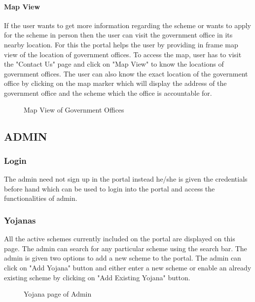 \documentclass[conference]{IEEEtran}
\begin{document}
\paragraph{Map View}
If the user wants to get more information regarding the scheme or wants to apply for the scheme in person then the user can visit the government office in its nearby location. For this the portal helps the user by providing in frame map view of the location of government offices.
To access the map, user has to visit the "Contact Us" page and click on "Map View" to know the locations of government offices. The user can also know the exact location of the government office by clicking on the map marker which will display the address of the government office and the scheme which the office is accountable for.
\begin{figure}[h!]
\centering
{}
\caption{Map View of Government Offices}
\end{figure}


\subsection{ADMIN}
\subsubsection{Login}
The admin need not sign up in the portal instead he/she is given the credentials before hand which can be used to login into the portal and access the functionalities of admin.
\subsubsection{Yojanas}
All the active schemes currently included on the portal are displayed on this page. The admin can search for any particular scheme using the search bar. The admin is given two options to add a new scheme to the portal. The admin can click on "Add Yojana" button and either enter a new scheme or enable an already existing scheme by clicking on "Add Existing Yojana" button. 
\begin{figure}[h!]
\centering
{}
\caption{Yojana page of Admin}
\end{figure}
\end{document}
